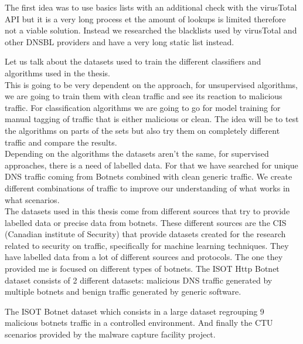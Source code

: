 The first idea was to use basics lists with an additional check with the virusTotal API but it is a very long process et the amount of lookups is limited therefore not a viable solution. Instead we researched the blacklists used by virusTotal and other DNSBL providers and have a very long static list instead.


Let us talk about the datasets used to train the different classifiers and algorithms used in the thesis.\\
This is going to be very dependent on the approach, for unsupervised algorithms, we are going to train them with clean traffic and see its reaction to malicious traffic. For classification algorithms we are going to go for model training for manual tagging of traffic that is either malicious or clean.
The idea will be to test the algorithms on parts of the sets but also try them on completely different traffic and compare the results.
\\

Depending on the algorithms the datasets aren't the same, for supervised approaches, there is a need of labelled data. For that we have searched for unique DNS traffic coming from Botnets combined with clean generic traffic. We create different combinations of traffic to improve our understanding of what works in what scenarios.\\


The datasets used in this thesis come from different sources that try to provide labelled data or precise data from botnets. These different sources are the CIS (Canadian institute of Security) that provide datasets created for the research related to security on traffic, specifically for machine learning techniques. They have labelled data from a lot of different sources and protocols. The one they provided me is focused on different types of botnets.
The ISOT Http Botnet dataset consists of 2 different datasets: malicious DNS traffic generated by multiple botnets and benign traffic generated by generic software. 

The ISOT Botnet dataset which consists in a large dataset regrouping 9 malicious botnets traffic in a controlled environment. 
And finally the CTU scenarios provided by the malware capture facility project.

